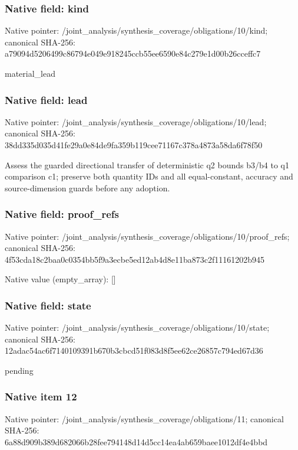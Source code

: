 \documentclass[10pt,a4paper]{article}
\begin{document}
\subsubsection{Native field: kind}
Native pointer: /joint\_\allowbreak{}analysis/synthesis\_\allowbreak{}coverage/obligations/10/kind; canonical SHA-256: a79094d5206499c86794e049e918245ccb55ee6590e84c279e1d00b26cceffc7

\begingroup\raggedright\sloppy material\_\allowbreak{}lead\par\endgroup

\subsubsection{Native field: lead}
Native pointer: /joint\_\allowbreak{}analysis/synthesis\_\allowbreak{}coverage/obligations/10/lead; canonical SHA-256: 38dd335d035d41fe29a0e84de9fa359b119cee71167c378a4873a58da6f78f50

\begingroup\raggedright\sloppy Assess the guarded directional transfer of deterministic q2 bounds b3/\allowbreak{}b4 to q1 comparison c1;\allowbreak{} preserve both quantity IDs and all equal-constant,\allowbreak{} accuracy and source-dimension guards before any adoption.\par\endgroup

\subsubsection{Native field: proof\_\allowbreak{}refs}
Native pointer: /joint\_\allowbreak{}analysis/synthesis\_\allowbreak{}coverage/obligations/10/proof\_\allowbreak{}refs; canonical SHA-256: 4f53cda18c2baa0c0354bb5f9a3ecbe5ed12ab4d8e11ba873c2f11161202b945

Native value (empty\_\allowbreak{}array): []

\subsubsection{Native field: state}
Native pointer: /joint\_\allowbreak{}analysis/synthesis\_\allowbreak{}coverage/obligations/10/state; canonical SHA-256: 12adac54ac6f7140109391b670b3cbcd51f083d8f5ee62ce26857c794ed67d36

\begingroup\raggedright\sloppy pending\par\endgroup

\subsubsection{Native item 12}
Native pointer: /joint\_\allowbreak{}analysis/synthesis\_\allowbreak{}coverage/obligations/11; canonical SHA-256: 6a88d909b389d682066b28fee794148d14d5cc14ea4ab659baee1012df4e4bbd
\end{document}
